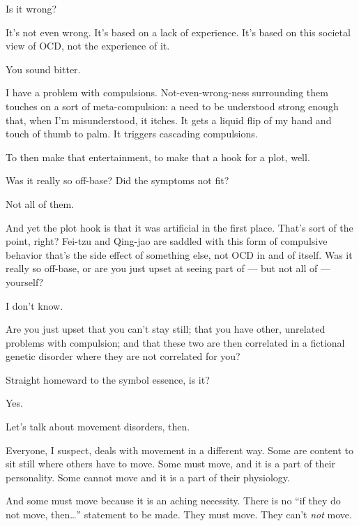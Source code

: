 \begin{paracol}{2}
\begin{leftcolumn}
\begin{ally}
Is it wrong?
\end{ally}
It's not even wrong. It's based on a lack of experience. It's based on this societal view of OCD, not the experience of it.

\begin{ally}
You sound bitter.
\end{ally}
I have a problem with compulsions. Not-even-wrong-ness surrounding them touches on a sort of meta-compulsion: a need to be understood strong enough that, when I'm misunderstood, it itches. It gets a liquid flip of my hand and touch of thumb to palm. It triggers cascading compulsions.

To then make that entertainment, to make that a hook for a plot, well.

\begin{ally}
Was it really so off-base? Did the symptoms not fit?
\end{ally}
Not all of them.

\begin{ally}
And yet the plot hook is that it was artificial in the first place. That's sort of the point, right? Fei-tzu and Qing-jao are saddled with this form of compulsive behavior that's the side effect of something else, not OCD in and of itself. Was it really so off-base, or are you just upset at seeing part of --- but not all of --- yourself?
\end{ally}
I don't know.

\begin{ally}
Are you just upset that you can't stay still; that you have other, unrelated problems with compulsion; and that these two are then correlated in a fictional genetic disorder where they are not correlated for you?
\end{ally}
Straight homeward to the symbol essence, is it?

\begin{ally}
Yes.
\end{ally}
Let's talk about movement disorders, then.
\newpage

\noindent Everyone, I suspect, deals with movement in a different way. Some are content to sit still where others have to move. Some must move, and it is a part of their personality. Some cannot move and it is a part of their physiology.

And some must move because it is an aching necessity. There is no ``if they do not move, then\ldots{}'' statement to be made. They must move. They can't \emph{not} move.


\end{leftcolumn}
\end{paracol}
